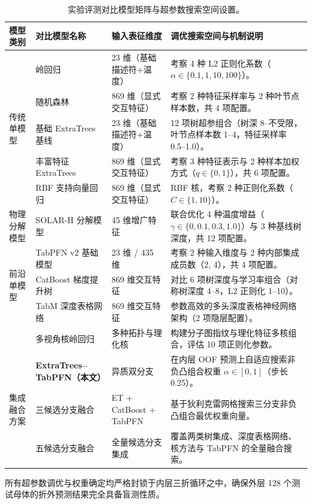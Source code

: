 \begin{table}[htbp]
  \centering\small
  \caption{实验评测对比模型矩阵与超参数搜索空间设置。}
  \label{tab:v2-experiment-matrix}
  \begin{tabularx}{\linewidth}{@{}lllX@{}}
    \toprule
    模型类别 & 对比模型名称 & 输入表征维度 & 调优搜索空间与机制说明 \\
    \midrule
    \multirow{5}{*}{传统单模型}
    & 岭回归 & 23 维（基础描述符+温度） & 考察 4 种 L2 正则化系数（$\alpha \in \{0.1, 1, 10, 100\}$）。 \\
    & 随机森林 & 869 维（显式交互特征） & 考察 2 种特征采样率与 2 种叶节点样本数，共 4 项配置。 \\
    & 基础 ExtraTrees 基线 & 23 维（基础描述符+温度） & 12 项树超参组合（树深 8--不受限，叶节点样本数 1--4，特征采样率 0.5--1.0）。 \\
    & 丰富特征 ExtraTrees & 869 维（显式交互特征） & 考察 3 种特征表示与 2 种样本加权方式（$q \in \{0, 1\}$），共 6 项配置。 \\
    & RBF 支持向量回归 & 869 维（显式交互特征） & RBF 核，考察 2 种正则化系数（$C \in \{1, 10\}$）。 \\
    \midrule
    物理分解模型 & SOLAR-H 分解模型 & 45 维增广特征 & 联合优化 4 种温度增益（$\gamma \in \{0, 0.1, 0.3, 1.0\}$）与 3 种基线树深度，共 12 项配置。 \\
    \midrule
    \multirow{3}{*}{前沿单模型} 
    & TabPFN v2 基础模型 & 23 维 / 435 维 & 考察 2 种输入维度与 2 种内部集成成员数（2, 4），共 4 项配置。 \\
    & CatBoost 梯度提升树 & 869 维交互特征 & 对比 6 项树深度与学习率组合（对称树深度 4--8，L2 正则化 1--10）\cite{catboost2018}。 \\
    & TabM 深度表格网络 & 869 维交互特征 & 参数高效的多头深度表格神经网络架构（2 项隐层配置）\cite{tabm2025}。 \\
    & 多视角核岭回归 & 多种拓扑与理化核 & 构建分子图指纹与理化特征多核组合，评估 10 项正则化参数。 \\
    \midrule
    \multirow{3}{*}{集成融合方案} 
    & \textbf{ExtraTrees--TabPFN（本文）} & 异质双分支 & 在内层 OOF 预测上自适应搜索非负凸组合权重 $\alpha \in [0, 1]$（步长 0.25）。 \\
    & 三候选分支融合 & ET + CatBoost + TabPFN & 基于狄利克雷网格搜索三分支非负凸组合最优权重向量。 \\
    & 五候选分支融合 & 全量候选分支集成 & 覆盖两类树集成、深度表格网络、核方法与 TabPFN 的全量融合搜索。 \\
    \bottomrule
  \end{tabularx}
\end{table}

所有超参数调优与权重确定均严格封锁于内层三折循环之中，确保外层 128 个测试母体的折外预测结果完全具备盲测性质。
